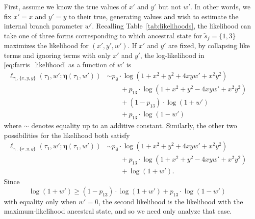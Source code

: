 \documentclass{article}
\newcommand{\siteSplit}{\tilde{s}}
\newcommand{\fullAncestralSplitPartitions}{\boldsymbol\eta}
\begin{document}
First, assume we know the true values of $x'$ and $y'$ but not $w'$.
In other words, we fix $x'=x$ and $y'=y$ to their true, generating values and wish to estimate the internal branch parameter $w'$.
Recalling Table~\ref{tab:likelihoods}, the likelihood can take one of three forms corresponding to which ancestral state for $\siteSplit_j=\{1,3\}$ maximizes the likelihood for $(x',y',w')$.
If $x'$ and $y'$ are fixed, by collapsing like terms and ignoring terms with only $x'$ and $y'$, the log-likelihood in \eqref{eq:farris_likelihood} as a function of $w'$ is
\begin{align*}
    \ell_{\tau_1,\{x,y,y\}}(\tau_1, w'; \fullAncestralSplitPartitions(\tau_1,w'))
    &\sim     p_{\emptyset}  \cdot\log(1+x^2+y^2+4xyw'+x^2y^2) \\
    &\qquad + p_{13}         \cdot\log(1+x^2+y^2-4xyw'+x^2y^2) \\
    &\qquad + (1 - p_{13})\cdot\log(1+w') \\
    &\qquad + p_{13}\cdot\log(1-w')
\end{align*}
where $\sim$ denotes equality up to an additive constant.
Similarly, the other two possibilities for the likelihood both satisfy
\begin{align*}
    \ell_{\tau_1,\{x,y,y\}}(\tau_1, w'; \fullAncestralSplitPartitions(\tau_1,w'))
    &\sim     p_{\emptyset}  \cdot\log(1+x^2+y^2+4xyw'+x^2y^2) \\
    &\qquad + p_{13}         \cdot\log(1+x^2+y^2-4xyw'+x^2y^2) \\
    &\qquad + \log(1+w').
\end{align*}
Since
$$
\log(1+w') \geq (1 - p_{13})\cdot\log(1+w') + p_{13}\cdot\log(1-w')
$$
with equality only when $w'=0$, the second likelihood is the likelihood with the maximum-likelihood ancestral state, and so we need only analyze that case.
\end{document}
